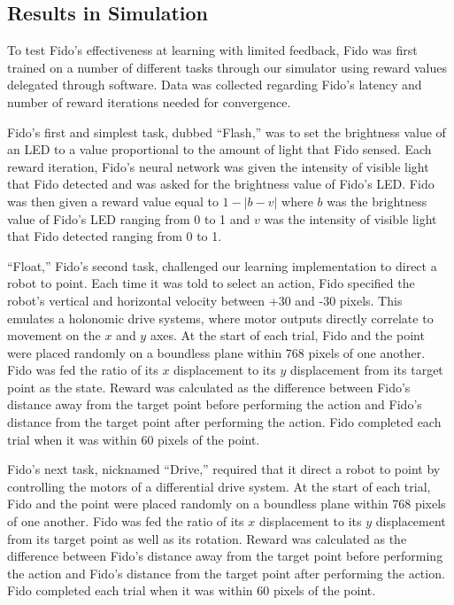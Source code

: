 \subsection{Results in Simulation}

To test Fido's effectiveness at learning with limited feedback, Fido was first trained on a number of different tasks through our simulator using reward values delegated through software.
Data was collected regarding Fido's latency and number of reward iterations needed for convergence.

Fido's first and simplest task, dubbed ``Flash,'' was to set the brightness value of an LED to a value proportional to the amount of light that Fido sensed.
Each reward iteration, Fido's neural network was given the intensity of visible light that Fido detected and was asked for the brightness value of Fido's LED.
Fido was then given a reward value equal to $1 - |b - v|$ where $b$ was the brightness value of Fido's LED ranging from 0 to 1 and $v$ was the intensity of visible light that Fido detected ranging from 0 to 1.

``Float,'' Fido's second task, challenged our learning implementation to direct a robot to point.
Each time it was told to select an action, Fido specified the robot's vertical and horizontal velocity between +30 and -30 pixels.
This emulates a holonomic drive systems, where motor outputs directly correlate to movement on the $x$ and $y$ axes.
At the start of each trial, Fido and the point were placed randomly on a boundless plane within 768 pixels of one another.
Fido was fed the ratio of its $x$ displacement to its $y$ displacement from its target point as the state.
Reward was calculated as the difference between Fido's distance away from the target point before performing the action and Fido's distance from the target point after performing the action.
Fido completed each trial when it was within 60 pixels of the point.

Fido's next task, nicknamed ``Drive,'' required that it direct a robot to point by controlling the motors of a differential drive system.
At the start of each trial, Fido and the point were placed randomly on a boundless plane within 768 pixels of one another.
Fido was fed the ratio of its $x$ displacement to its $y$ displacement from its target point as well as its rotation.
Reward was calculated as the difference between Fido's distance away from the target point before performing the action and Fido's distance from the target point after performing the action.
Fido completed each trial when it was within 60 pixels of the point.

